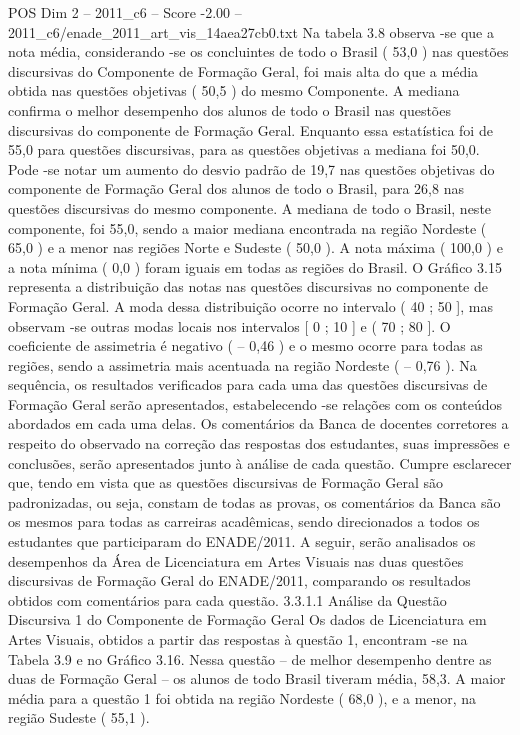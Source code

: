 \begin{textsample}{POS Dim 2 – 2011\_c6 – Score -2.00 – 2011\_c6/enade\_2011\_art\_vis\_14aea27cb0.txt}
Na tabela 3.8 observa -se que a nota média, considerando -se os concluintes de todo o Brasil ( 53,0 ) nas questões discursivas do Componente de Formação Geral, foi mais alta do que a média obtida nas questões objetivas ( 50,5 ) do mesmo Componente.
A mediana confirma o melhor desempenho dos alunos de todo o Brasil nas questões discursivas do componente de Formação Geral.
Enquanto essa estatística foi de 55,0 para questões discursivas, para as questões objetivas a mediana foi 50,0.
Pode -se notar um aumento do desvio padrão de 19,7 nas questões objetivas do componente de Formação Geral dos alunos de todo o Brasil, para 26,8 nas questões discursivas do mesmo componente.
A mediana de todo o Brasil, neste componente, foi 55,0, sendo a maior mediana encontrada na região Nordeste ( 65,0 ) e a menor nas regiões Norte e Sudeste ( 50,0 ).
A nota máxima ( 100,0 ) e a nota mínima ( 0,0 ) foram iguais em todas as regiões do Brasil.
O Gráfico 3.15 representa a distribuição das notas nas questões discursivas no componente de Formação Geral.
A moda dessa distribuição ocorre no intervalo ( 40 ; 50 ], mas observam -se outras modas locais nos intervalos [ 0 ; 10 ] e ( 70 ; 80 ].
O coeficiente de assimetria é negativo ( – 0,46 ) e o mesmo ocorre para todas as regiões, sendo a assimetria mais acentuada na região Nordeste ( – 0,76 ).
Na sequência, os resultados verificados para cada uma das questões discursivas de Formação Geral serão apresentados, estabelecendo -se relações com os conteúdos abordados em cada uma delas.
Os comentários da Banca de docentes corretores a respeito do observado na correção das respostas dos estudantes, suas impressões e conclusões, serão apresentados junto à análise de cada questão.
Cumpre esclarecer que, tendo em vista que as questões discursivas de Formação Geral são padronizadas, ou seja, constam de todas as provas, os comentários da Banca são os mesmos para todas as carreiras acadêmicas, sendo direcionados a todos os estudantes que participaram do ENADE/2011.
A seguir, serão analisados os desempenhos da Área de Licenciatura em Artes Visuais nas duas questões discursivas de Formação Geral do ENADE/2011, comparando os resultados obtidos com comentários para cada questão. 3.3.1.1 Análise da Questão Discursiva 1 do Componente de Formação Geral Os dados de Licenciatura em Artes Visuais, obtidos a partir das respostas à questão 1, encontram -se na Tabela 3.9 e no Gráfico 3.16.
Nessa questão – de melhor desempenho dentre as duas de Formação Geral – os alunos de todo Brasil tiveram média, 58,3.
A maior média para a questão 1 foi obtida na região Nordeste ( 68,0 ), e a menor, na região Sudeste ( 55,1 ).

\end{textsample}
